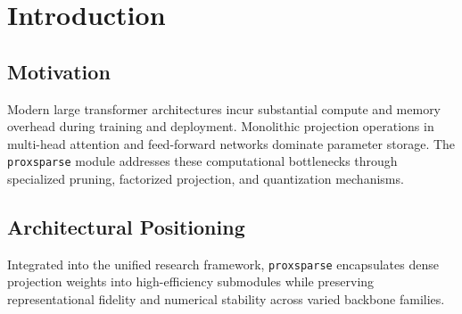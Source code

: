 \section{Introduction}

\subsection{Motivation}
Modern large transformer architectures incur substantial compute and memory overhead during training and deployment. Monolithic projection operations in multi-head attention and feed-forward networks dominate parameter storage. The \texttt{proxsparse} module addresses these computational bottlenecks through specialized pruning, factorized projection, and quantization mechanisms.

\subsection{Architectural Positioning}
Integrated into the unified research framework, \texttt{proxsparse} encapsulates dense projection weights into high-efficiency submodules while preserving representational fidelity and numerical stability across varied backbone families.
